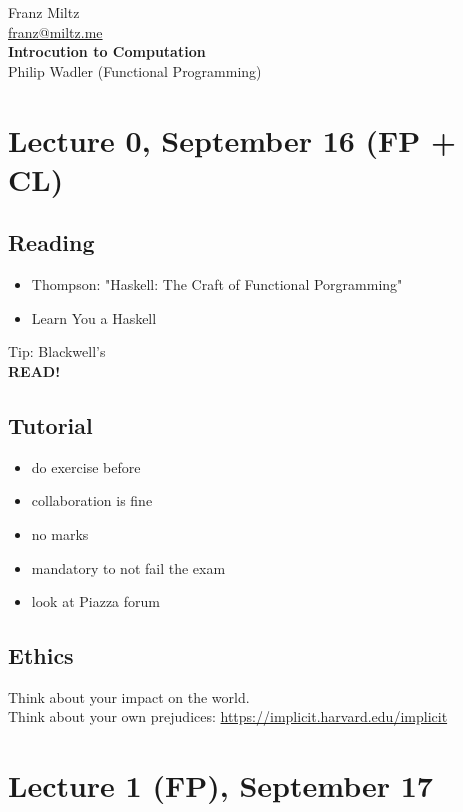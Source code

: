 \documentclass{article}
\begin{document}
\begin{titlepage}
    \begin{center}        
        \LARGE Franz Miltz\\
        
        \url{franz@miltz.me}\\
        \vspace{5cm}
        \LARGE\textbf{Introcution to Computation}\\
        \vspace{1cm}
        Philip Wadler (Functional Programming)
    \end{center}
\end{titlepage}
\tableofcontents
\pagebreak
\section{Lecture 0, September 16 (FP + CL)}
\subsection{Reading}
\begin{itemize}
    \item Thompson: "Haskell: The Craft of Functional Porgramming"
    \item Learn You a Haskell
\end{itemize}
Tip: Blackwell's\\
\textbf{READ!}
\subsection{Tutorial}
\begin{itemize}
    \item do exercise before
    \item collaboration is fine
    \item no marks
    \item mandatory to not fail the exam
\end{itemize}
\begin{itemize}
    \item look at Piazza forum
\end{itemize}
\subsection{Ethics}
Think about your impact on the world.\\
Think about your own prejudices:
\url{https://implicit.harvard.edu/implicit}
\section{Lecture 1 (FP), September 17}
\end{document}
